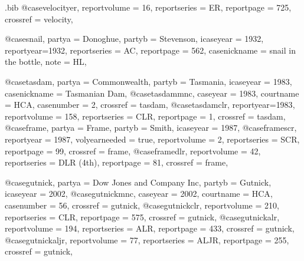 \begin{filecontents*}{\jobname.bib}
@case{velocityer,
  reportvolume = {16},
  reportseries = {ER},
  reportpage = {725},
  crossref = {velocity},
}





@case{snail,
  partya = {Donoghue}, 
  partyb = {Stevenson},
  icaseyear = {1932},
  reportyear={1932},
  reportseries = {AC},
  reportpage = {562},
  casenickname = {snail in the bottle},
  note = {HL},
	}


@case{tasdam,
  partya = {Commonwealth}, 
  partyb = {Tasmania},
  icaseyear = {1983},
  casenickname = {Tasmanian Dam},
  }
@case{tasdammnc,
  caseyear = {1983},
  courtname = {HCA},
  casenumber = {2},
  crossref = {tasdam},
  }
@case{tasdamclr,
  reportyear={1983},
  reportvolume = {158},
  reportseries = {CLR},
  reportpage = {1},
  crossref = {tasdam},
  	}
@case{frame,
  partya = {Frame}, 
  partyb = {Smith},
  icaseyear = {1987},
  }
@case{framescr,
  reportyear = {1987},
  volyearneeded = {true},
  reportvolume = {2},
  reportseries = {SCR},
  reportpage = {99},
  crossref = {frame},
  }
@case{framedlr,
  reportvolume = {42},
  reportseries = {DLR (4th)},
  reportpage = {81},
  crossref = {frame},
  	}









@case{gutnick,
  partya = {Dow Jones and Company Inc}, 
  partyb = {Gutnick},
  icaseyear = {2002},
  }
@case{gutnickmnc,
  caseyear = {2002},
  courtname = {HCA},
  casenumber = {56},
  crossref = {gutnick},
  }
@case{gutnickclr,
  reportvolume = {210},
  reportseries = {CLR},
  reportpage = {575},
  crossref = {gutnick},
  	}
@case{gutnickalr,
  reportvolume = {194},
  reportseries = {ALR},
  reportpage = {433},
  crossref = {gutnick},
  	}
@case{gutnickaljr,
  reportvolume = {77},
  reportseries = {ALJR},
  reportpage = {255},
  crossref = {gutnick},
  	}






\end{filecontents*}
